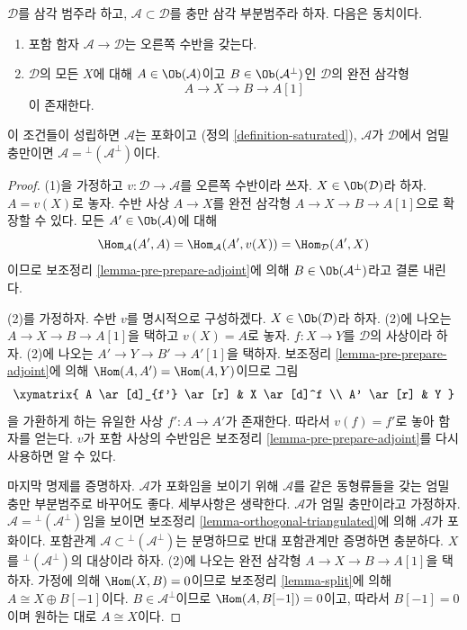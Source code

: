 \begin{lemma}
\label{lemma-right-adjoint}
$\mathcal{D}$를 삼각 범주라 하고,
$\mathcal{A} \subset \mathcal{D}$를 충만 삼각 부분범주라 하자.
다음은 동치이다.
\begin{enumerate}
\item 포함 함자 $\mathcal{A} \to \mathcal{D}$는 오른쪽 수반을 갖는다.
\item $\mathcal{D}$의 모든 $X$에 대해 $A \in \Ob(\mathcal{A})$이고
$B \in \Ob(\mathcal{A}^\perp)$인 $\mathcal{D}$의 완전 삼각형
$$
A \to X \to B \to A[1]
$$
이 존재한다.
\end{enumerate}
이 조건들이 성립하면 $\mathcal{A}$는 포화이고
(정의 \ref{definition-saturated}), $\mathcal{A}$가 $\mathcal{D}$에서
엄밀 충만이면 $\mathcal{A} = {}^\perp(\mathcal{A}^\perp)$이다.
\end{lemma}

\begin{proof}
(1)을 가정하고 $v : \mathcal{D} \to \mathcal{A}$를 오른쪽 수반이라
쓰자. $X \in \Ob(\mathcal{D})$라 하자. $A = v(X)$로 놓자.
수반 사상 $A \to X$를 완전 삼각형
$A \to X \to B \to A[1]$으로 확장할 수 있다. 모든
$A' \in \Ob(\mathcal{A})$에 대해
$$
\Hom_\mathcal{A}(A', A) =
\Hom_\mathcal{A}(A', v(X)) =
\Hom_\mathcal{D}(A', X)
$$
이므로 보조정리 \ref{lemma-pre-prepare-adjoint}에 의해
$B \in \Ob(\mathcal{A}^\perp)$라고 결론 내린다.

\medskip\noindent
(2)를 가정하자. 수반 $v$를 명시적으로 구성하겠다.
$X \in \Ob(\mathcal{D})$라 하자. (2)에 나오는
$A \to X \to B \to A[1]$을 택하고 $v(X) = A$로 놓자.
$f : X \to Y$를 $\mathcal{D}$의 사상이라 하자. (2)에 나오는
$A' \to Y \to B' \to A'[1]$을 택하자. 보조정리
\ref{lemma-pre-prepare-adjoint}에 의해
$\Hom(A, A') = \Hom(A, Y)$이므로 그림
$$
\xymatrix{
A \ar[d]_{f'} \ar[r] & X \ar[d]^f \\
A' \ar[r] & Y
}
$$
을 가환하게 하는 유일한 사상 $f' : A \to A'$가 존재한다.
따라서 $v(f) = f'$로 놓아 함자를 얻는다. $v$가 포함 사상의 수반임은
보조정리 \ref{lemma-pre-prepare-adjoint}를 다시 사용하면 알 수 있다.

\medskip\noindent
마지막 명제를 증명하자. $\mathcal{A}$가 포화임을 보이기 위해
$\mathcal{A}$를 같은 동형류들을 갖는 엄밀 충만 부분범주로 바꾸어도
좋다. 세부사항은 생략한다. $\mathcal{A}$가 엄밀 충만이라고 가정하자.
$\mathcal{A} = {}^\perp(\mathcal{A}^\perp)$임을 보이면 보조정리
\ref{lemma-orthogonal-triangulated}에 의해 $\mathcal{A}$가 포화이다.
포함관계 $\mathcal{A} \subset {}^\perp(\mathcal{A}^\perp)$는 분명하므로
반대 포함관계만 증명하면 충분하다. $X$를
${}^\perp(\mathcal{A}^\perp)$의 대상이라 하자. (2)에 나오는 완전
삼각형 $A \to X \to B \to A[1]$을 택하자. 가정에 의해
$\Hom(X, B) = 0$이므로 보조정리 \ref{lemma-split}에 의해
$A \cong X \oplus B[-1]$이다. $B \in \mathcal{A}^\perp$이므로
$\Hom(A, B[-1]) = 0$이고, 따라서 $B[-1] = 0$이며 원하는 대로
$A \cong X$이다.
\end{proof}

